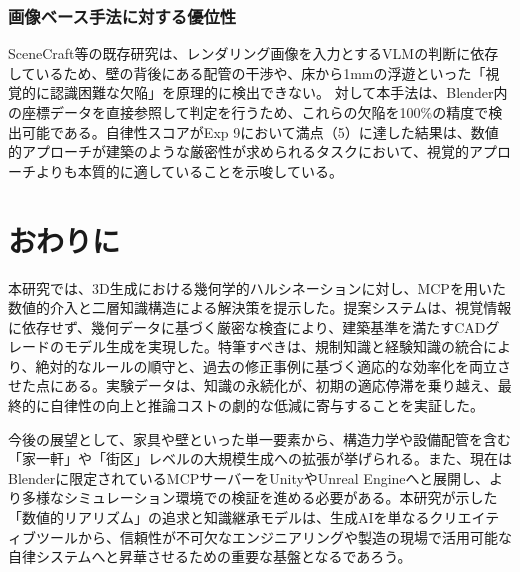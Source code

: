 \documentclass[dvipdfmx, a4paper, 9pt]{deimj}
\begin{document}
\subsubsection{画像ベース手法に対する優位性}
SceneCraft等の既存研究は、レンダリング画像を入力とするVLMの判断に依存しているため、壁の背後にある配管の干渉や、床から1mmの浮遊といった「視覚的に認識困難な欠陥」を原理的に検出できない。
対して本手法は、Blender内の座標データを直接参照して判定を行うため、これらの欠陥を100\%の精度で検出可能である。自律性スコアがExp 9において満点（5）に達した結果は、数値的アプローチが建築のような厳密性が求められるタスクにおいて、視覚的アプローチよりも本質的に適していることを示唆している。

\section{おわりに}

本研究では、3D生成における幾何学的ハルシネーションに対し、MCPを用いた数値的介入と二層知識構造による解決策を提示した。提案システムは、視覚情報に依存せず、幾何データに基づく厳密な検査により、建築基準を満たすCADグレードのモデル生成を実現した。特筆すべきは、規制知識と経験知識の統合により、絶対的なルールの順守と、過去の修正事例に基づく適応的な効率化を両立させた点にある。実験データは、知識の永続化が、初期の適応停滞を乗り越え、最終的に自律性の向上と推論コストの劇的な低減に寄与することを実証した。

今後の展望として、家具や壁といった単一要素から、構造力学や設備配管を含む「家一軒」や「街区」レベルの大規模生成への拡張が挙げられる。また、現在はBlenderに限定されているMCPサーバーをUnityやUnreal Engineへと展開し、より多様なシミュレーション環境での検証を進める必要がある。本研究が示した「数値的リアリズム」の追求と知識継承モデルは、生成AIを単なるクリエイティブツールから、信頼性が不可欠なエンジニアリングや製造の現場で活用可能な自律システムへと昇華させるための重要な基盤となるであろう。




\end{document}
